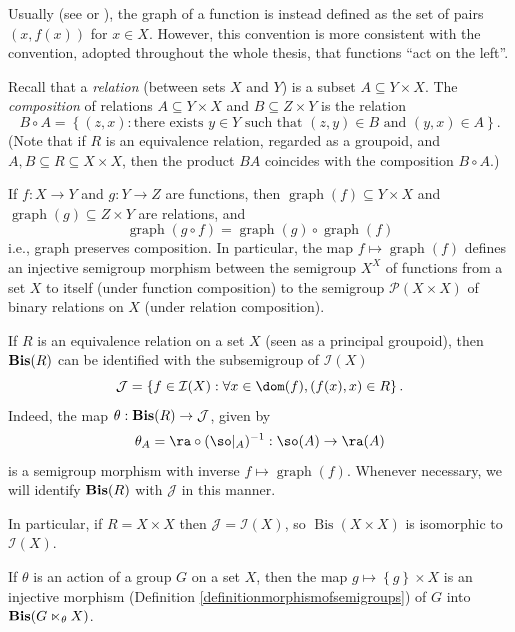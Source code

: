 \begin{remark}
Usually (see \cite[p.\ 11]{MR1940513} or \cite[Section 8]{MR0453532}), the graph of a function is instead defined as the set of pairs $(x,f(x))$ for $x\in X$. However, this convention is more consistent with the convention, adopted throughout the whole thesis, that functions ``act on the left''.

Recall that a \emph{relation} (between sets $X$ and $Y$) is a subset $A\subseteq Y\times X$. The \emph{composition} of relations $A\subseteq Y\times X$ and $B\subseteq Z\times Y$ is the relation
\[B\circ A=\left\{(z,x):\text{there exists }y\in Y\text{ such that }(z,y)\in B\text{ and }(y,x)\in A\right\}.\]
(Note that if $R$ is an equivalence relation, regarded as a groupoid, and $A,B\subseteq R\subseteq X\times X$, then the product $BA$ coincides with the composition $B\circ A$.)

If $f:X\to Y$ and $g:Y\to Z$ are functions, then $\operatorname{graph}(f)\subseteq Y\times X$ and $\operatorname{graph}(g)\subseteq Z\times Y$ are relations, and
\[\operatorname{graph}(g\circ f)=\operatorname{graph}(g)\circ\operatorname{graph}(f)\]
i.e., graph preserves composition. In particular, the map $f\mapsto\operatorname{graph}(f)$ defines an injective semigroup morphism between the semigroup $X^X$ of functions from a set $X$ to itself (under function composition) to the semigroup $\mathcal{P}(X\times X)$ of binary relations on $X$ (under relation composition).
\end{remark}

\begin{example}\label{examplebisectionsofequivalencerelationarefunctions}
If $R$ is an equivalence relation on a set $X$ (seen as a principal groupoid), then $\operatorname{\bf Bis}(R)$ can be identified with the subsemigroup of $\mathcal{I}(X)$
\[\mathcal{J}=\left\{f\in\mathcal{I}(X):\forall x\in\dom(f), (f(x),x)\in R\right\}.\]
Indeed, the map $\theta:\operatorname{\bf Bis}(R)\to\mathcal{J}$, given by
\[\theta_A=\ra\circ(\so|_A)^{-1}:\so(A)\to\ra(A)\]
is a semigroup morphism with inverse $f\mapsto\operatorname{graph}(f)$. Whenever necessary, we will identify $\operatorname{\bf Bis}(R)$ with $\mathcal{J}$ in this manner.

In particular, if $R=X\times X$ then $\mathcal{J}=\mathcal{I}(X)$, so $\operatorname{Bis}(X\times X)$ is isomorphic to $\mathcal{I}(X)$.
\end{example}

\begin{example}\label{exampleginsidebisectionsoftransformationgroupoid}
If $\theta$ is an action of a group $G$ on a set $X$, then the map $g\mapsto\left\{g\right\}\times X$ is an injective morphism (Definition \ref{definitionmorphismofsemigroups}) of $G$ into $\operatorname{\bf{Bis}}(G\ltimes_\theta X)$.
\end{example}

